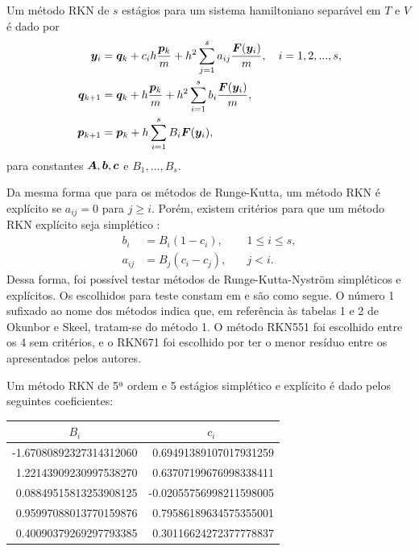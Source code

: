 \begin{method}\citep[41]{Hairer2006-oz}
    Um método RKN de $s$ estágios para um sistema hamiltoniano separável em $T$ e $V$ é dado por
    \begin{align*}
        \bm y_i & = \bm q_k + c_i h \dfrac{\bm p_k}{m} + h^2 \sum_{j=1}^{s} a_{ij} \dfrac{\bm F(\bm y_i)}{m}, \quad i = 1, 2, ..., s, \\
        \bm q_{k+1} &= \bm q_k + h \dfrac{\bm p_k}{m} + h^2 \sum_{i=1}^{s} b_i \dfrac{\bm F(\bm y_i)}{m}, \\
        \bm p_{k+1} &= \bm p_k + h \sum_{i=1}^{s} B_i \bm F(\bm y_i),
    \end{align*}
    para constantes $\bm A, \bm b, \bm c$ e $B_1, ..., B_s$.
\end{method}

Da mesma forma que para os métodos de Runge-Kutta, um método RKN é explícito se $a_{ij} = 0$ para $j \geq i$. Porém, existem critérios para que um método RKN explícito seja simplético \citep[376]{Okunbor1994}:
\begin{align}
    b_i &= B_i (1-c_i), &\quad 1 \leq i \leq s, \\
    a_{ij} &= B_j(c_i - c_j), &\quad j < i.
\end{align}
Dessa forma, foi possível testar métodos de Runge-Kutta-Nyström simpléticos e explícitos. Os escolhidos para teste constam em \cite{Okunbor1994} e são como segue. O número 1 sufixado ao nome dos métodos indica que, em referência às tabelas 1 e 2 de Okunbor e Skeel, tratam-se do método 1. O método RKN551 foi escolhido entre os 4 sem critérios, e o RKN671 foi escolhido por ter o menor resíduo entre os apresentados pelos autores.

\begin{method}[RKN551]\label{metodo:rkn551}
    Um método RKN de 5ª ordem e 5 estágios simplético e explícito é dado pelos seguintes coeficientes:
    \begin{table}[H]
        \centering
        \begin{tabular}{r|r}
            \multicolumn{1}{c}{$B_i$} & \multicolumn{1}{c}{$c_i$} \\
            \hline
            -1.67080892327314312060 &  0.69491389107017931259 \\ 
             1.22143909230997538270 &  0.63707199676998338411 \\ 
             0.08849515813253908125 & -0.02055756998211598005 \\ 
             0.95997088013770159876 &  0.79586189634575355001 \\ 
             0.40090379269297793385 &  0.30116624272377778837 \\
             \hline
        \end{tabular}
    \end{table}
\end{method}

